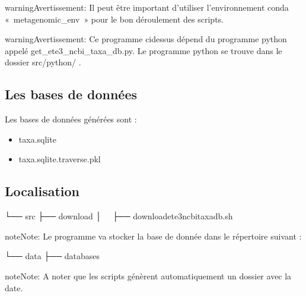 \documentclass[letterpaper,10pt,french]{sphinxmanual}
\begin{document}
\begin{sphinxadmonition}{warning}{Avertissement:}
Il peut être important d’utiliser l’environnement conda « metagenomic\_env » pour le bon déroulement des scripts.
\end{sphinxadmonition}

\begin{sphinxadmonition}{warning}{Avertissement:}
Ce programme ci\sphinxhyphen{}dessus dépend du programme python appelé get\_ete3\_ncbi\_taxa\_db.py. Le programme python se trouve dans le dossier src/python/ .
\end{sphinxadmonition}


\subsection{Les bases de données}
\label{\detokenize{download/download_ete3_ncbi_taxonomy_database.sh:les-bases-de-donnees}}
Les bases de données générées sont :
\begin{itemize}
\item {} 
taxa.sqlite

\item {} 
taxa.sqlite.traverse.pkl

\end{itemize}


\subsection{Localisation}
\label{\detokenize{download/download_ete3_ncbi_taxonomy_database.sh:localisation}}
\begin{sphinxVerbatim}[commandchars=\\\{\}]
└── src
 ├── download
 │   ├── download\PYGZus{}ete3\PYGZus{}ncbi\PYGZus{}taxa\PYGZus{}db.sh
\end{sphinxVerbatim}

\begin{sphinxadmonition}{note}{Note:}
Le programme va stocker la base de donnée dans le répertoire suivant :
\end{sphinxadmonition}

\begin{sphinxVerbatim}[commandchars=\\\{\}]
└── data
 ├── databases
\end{sphinxVerbatim}

\begin{sphinxadmonition}{note}{Note:}
A noter que les scripts génèrent automatiquement un dossier avec la date.
\end{sphinxadmonition}
\end{document}
